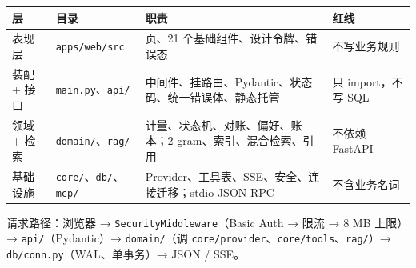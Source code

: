 {\def\LTcaptype{none} %
\begin{longtable}[]{@{}
  >{\raggedright\arraybackslash}p{}
  >{\raggedright\arraybackslash}p{}
  >{\raggedright\arraybackslash}p{}
  >{\raggedright\arraybackslash}p{}@{}}
\toprule\noalign{}
\begin{minipage}[b]{\linewidth}\raggedright
层
\end{minipage} & \begin{minipage}[b]{\linewidth}\raggedright
目录
\end{minipage} & \begin{minipage}[b]{\linewidth}\raggedright
职责
\end{minipage} & \begin{minipage}[b]{\linewidth}\raggedright
红线
\end{minipage} \\
\midrule\noalign{}
\endhead
\bottomrule\noalign{}
\endlastfoot
表现层 & \passthrough{\lstinline!apps/web/src!} & 6 页、21
个基础组件、设计令牌、错误态 & 不写业务规则 \\
装配 + 接口 &
\passthrough{\lstinline!main.py!}、\passthrough{\lstinline!api/!} &
中间件、挂路由、Pydantic、状态码、统一错误体、静态托管 & 只 import，不写
SQL \\
领域 + 检索 &
\passthrough{\lstinline!domain/!}、\passthrough{\lstinline!rag/!} &
计量、状态机、对账、偏好、账本；2-gram、索引、混合检索、引用 & 不依赖
FastAPI \\
基础设施 &
\passthrough{\lstinline!core/!}、\passthrough{\lstinline!db/!}、\passthrough{\lstinline!mcp/!}
& Provider、工具表、SSE、安全、连接迁移；stdio JSON-RPC &
不含业务名词 \\
\end{longtable}
}

请求路径：浏览器 → \passthrough{\lstinline!SecurityMiddleware!}（Basic
Auth → 限流 → 8 MB 上限）→ \passthrough{\lstinline!api/!}（Pydantic）→
\passthrough{\lstinline!domain/!}（调
\passthrough{\lstinline!core/provider!}、\passthrough{\lstinline!core/tools!}、\passthrough{\lstinline!rag/!}）→
\passthrough{\lstinline!db/conn.py!}（WAL、单事务）→ JSON / SSE。

